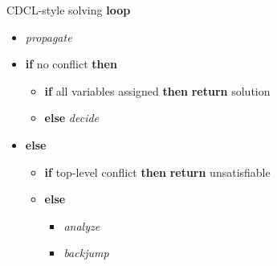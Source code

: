 \begin{frame}{CDCL-style solving}
  \bigskip
  \bigskip
  \textbf{loop}
  \begin{itemize}
  \item [] \textit{propagate}    \hfill{}
  \item [] \textbf{if} no conflict \textbf{then}
    \begin{itemize}\normalsize
    \item [] \textbf{if} all variables assigned
      \textbf{then}
      \textbf{return} solution
    \item [] \textbf{else}
      \textit{decide}            \hfill{}
    \end{itemize}
  \item [] \textbf{else}
    \begin{itemize}\normalsize
    \item [] \textbf{if} top-level conflict
      \textbf{then}
      \textbf{return} unsatisfiable
    \item [] \textbf{else}
      \begin{itemize}\normalsize
      \item [] \textit{analyze}  \hfill{}
      \item [] \textit{backjump} \hfill{}
      \end{itemize}
    \end{itemize}
  \end{itemize}
\end{frame}
%
